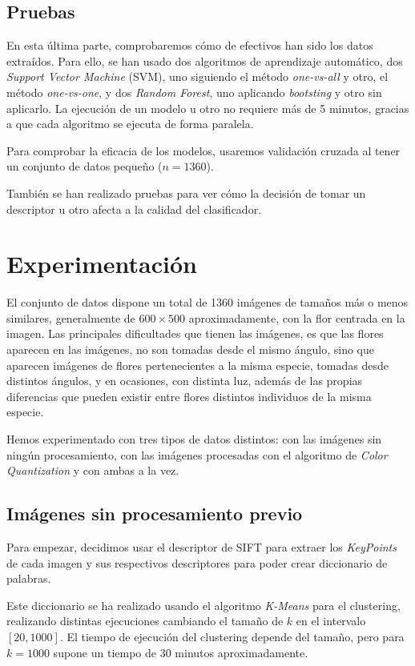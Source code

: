 \documentclass[paper=a4, fontsize=11pt]{article} %
\numberwithin{equation}{section} %
\numberwithin{figure}{section} %
\numberwithin{table}{section} %
\begin{document}
\subsection{Pruebas}

En esta última parte, comprobaremos cómo de efectivos han sido los datos extraídos. Para ello, se han usado dos algoritmos de aprendizaje automático, dos \textit{Support Vector Machine} (SVM), uno siguiendo el método \textit{one-vs-all} y otro, el método \textit{one-vs-one}, y dos \textit{Random Forest}, uno aplicando \textit{bootsting} y otro sin aplicarlo. La ejecución de un modelo u otro no requiere más de 5 minutos, gracias a que cada algoritmo se ejecuta de forma paralela.

Para comprobar la eficacia de los modelos, usaremos validación cruzada al tener un conjunto de datos pequeño ($n=1360$).

También se han realizado pruebas para ver cómo la decisión de tomar un descriptor u otro afecta a la calidad del clasificador.

\section{Experimentación}

El conjunto de datos dispone un total de 1360 imágenes de tamaños más o menos similares, generalmente de $600\times500$ aproximadamente, con la flor centrada en la imagen. Las principales dificultades que tienen las imágenes, es que las flores aparecen en las imágenes, no son tomadas desde el mismo ángulo, sino que aparecen imágenes de flores pertenecientes a la misma especie, tomadas desde distintos ángulos, y en ocasiones, con distinta luz, además de las propias diferencias que pueden existir entre flores distintos individuos de la misma especie.

Hemos experimentado con tres tipos de datos distintos: con las imágenes sin ningún procesamiento, con las imágenes procesadas con el algoritmo de \textit{Color Quantization} y con ambas a la vez.


\subsection{Imágenes sin procesamiento previo}
Para empezar, decidimos usar el descriptor de SIFT para extraer los \textit{KeyPoints} de cada imagen y sus respectivos descriptores para poder crear diccionario de palabras.

Este diccionario se ha realizado usando el algoritmo \textit{K-Means} para el clustering, realizando distintas ejecuciones cambiando el tamaño de $k$ en el intervalo $[20,1000]$. El tiempo de ejecución del clustering depende del tamaño, pero para $k=1000$ supone un tiempo de 30 minutos aproximadamente.
\end{document}
